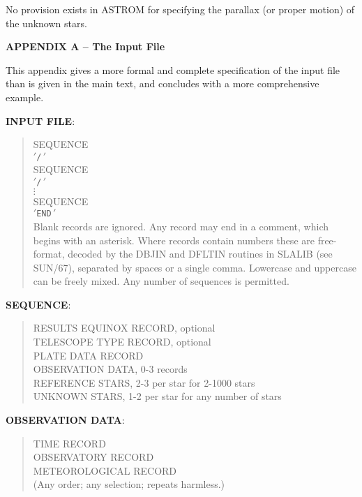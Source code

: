No provision exists in ASTROM for specifying the parallax (or proper motion)
of the unknown stars.

\pagebreak
{\bf APPENDIX A -- The Input File} \\
\vspace{3mm}

This appendix gives a more formal and complete specification of
the input file than is given in the main text, and concludes
with a more comprehensive example.
\vspace{3mm}

{\bf INPUT FILE}:

\begin{quote}
 SEQUENCE \\
 $'$\verb|/|$\,'$ \\
 SEQUENCE \\
 $'$\verb|/|$\,'$ \\
 $\vdots$ \\
 SEQUENCE \\
 $'$\verb|END|$\,'$ \\
 Blank records are ignored.
 Any record may end in a comment, which begins with an asterisk.
 Where records contain numbers these are free-format,
 decoded by the DBJIN and DFLTIN routines
 in SLALIB (see SUN/67), separated
 by spaces or a single comma.
 Lowercase and uppercase can be freely mixed.
 Any number of sequences is permitted.
\end{quote}

\goodbreak
{\bf SEQUENCE}:

\begin{quote}
 RESULTS EQUINOX RECORD, optional \\
 TELESCOPE TYPE RECORD, optional \\
 PLATE DATA RECORD \\
 OBSERVATION DATA, 0-3 records \\
 REFERENCE STARS, 2-3 per star for 2-1000 stars \\
 UNKNOWN STARS, 1-2 per star for any number of stars
\end{quote}

\goodbreak
{\bf OBSERVATION DATA}:

\begin{quote}
 TIME RECORD \\
 OBSERVATORY RECORD \\
 METEOROLOGICAL RECORD \\
 (Any order; any selection; repeats harmless.)
\end{quote}

